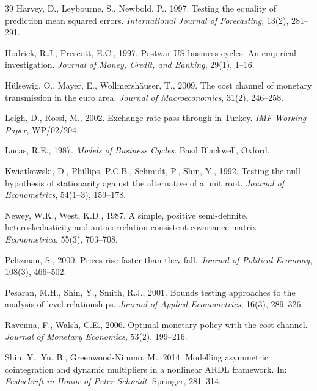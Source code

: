 \documentclass[review,12pt]{elsarticle}
\begin{document}
\begin{thebibliography}{39}
Harvey, D., Leybourne, S., Newbold, P., 1997. Testing the equality of prediction
mean squared errors. \textit{International Journal of Forecasting}, 13(2), 281--291.

Hodrick, R.J., Prescott, E.C., 1997. Postwar US business cycles: An empirical
investigation. \textit{Journal of Money, Credit, and Banking}, 29(1), 1--16.

H{\"u}lsewig, O., Mayer, E., Wollmersh{\"a}user, T., 2009. The cost channel of
monetary transmission in the euro area. \textit{Journal of Macroeconomics},
31(2), 246--258.

Leigh, D., Rossi, M., 2002. Exchange rate pass-through in Turkey.
\textit{IMF Working Paper}, WP/02/204.

Lucas, R.E., 1987. \textit{Models of Business Cycles}. Basil Blackwell, Oxford.

Kwiatkowski, D., Phillips, P.C.B., Schmidt, P., Shin, Y., 1992. Testing the
null hypothesis of stationarity against the alternative of a unit root.
\textit{Journal of Econometrics}, 54(1--3), 159--178.

Newey, W.K., West, K.D., 1987. A simple, positive semi-definite,
heteroskedasticity and autocorrelation consistent covariance matrix.
\textit{Econometrica}, 55(3), 703--708.

Peltzman, S., 2000. Prices rise faster than they fall. \textit{Journal of
Political Economy}, 108(3), 466--502.

Pesaran, M.H., Shin, Y., Smith, R.J., 2001. Bounds testing approaches to the
analysis of level relationships. \textit{Journal of Applied Econometrics},
16(3), 289--326.

Ravenna, F., Walsh, C.E., 2006. Optimal monetary policy with the cost channel.
\textit{Journal of Monetary Economics}, 53(2), 199--216.

Shin, Y., Yu, B., Greenwood-Nimmo, M., 2014. Modelling asymmetric cointegration
and dynamic multipliers in a nonlinear ARDL framework. In:
\textit{Festschrift in Honor of Peter Schmidt}. Springer, 281--314.


\end{thebibliography}
\end{document}
